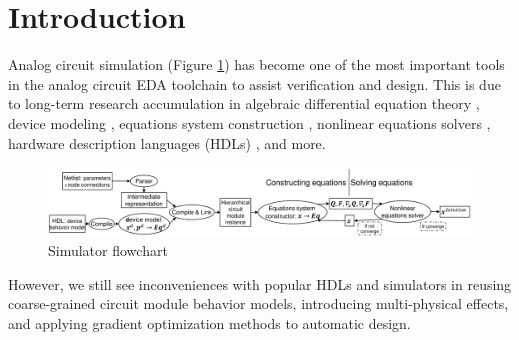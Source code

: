 \section{Introduction}
Analog circuit simulation (Figure \ref{fig:simulator-flowchart}) \cite{nagel1971computer,mccalla1971bias,Nagel:M382} has become one of the most important tools in the analog circuit EDA toolchain to assist verification and design. This is due to long-term research accumulation in algebraic differential equation theory \cite{estevez2000structural,kunkel2006differential,gunther2005modelling}, device modeling \cite{chauhan2012bsim,ezaki2008physics,gildenblat2006psp}, equations system construction \cite{hachtel1971sparse,ho1975modified,fijnvandraat2002time}, nonlinear equations solvers \cite{nastov2007fundamentals,najm2010circuit}, hardware description languages (HDLs) \cite{verilog2014verilog,ieee2006ieee-1364-2005,lemaitre2002adms,christen1999vhdl,pecheux2005vhdl}, and more.
\begin{figure}[htpb]
	\centering
	\includegraphics[width=1.0\textwidth]{fig/simulator-flowchart.pdf}
	\caption{Simulator flowchart}
	\label{fig:simulator-flowchart}
\end{figure}
However, we still see inconveniences with popular HDLs and simulators in reusing coarse-grained circuit module behavior models, introducing multi-physical effects, and applying gradient optimization methods to automatic design.
